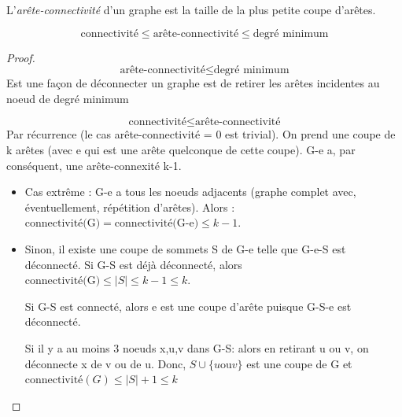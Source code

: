 \begin{mydef}
   L'\emph{arête-connectivité} d'un graphe est la taille de la plus petite coupe d'arêtes.
\end{mydef}

\begin{mytheo} 
  $$ \text{connectivité} \leq \text{arête-connectivité} \leq \text{degré minimum}$$
  \begin{proof}
    \noindent
    $$\text{arête-connectivité} \leq \text{degré minimum}$$
    Est une façon de déconnecter un graphe est de retirer les arêtes incidentes au noeud de degré minimum
    
    $$\text{connectivité} \leq \text{arête-connectivité}$$
    Par récurrence (le cas arête-connectivité = 0 est trivial). On prend une coupe de k arêtes (avec e qui est une arête quelconque de cette coupe). G-e a, par conséquent, une arête-connexité k-1. 
    \begin{itemize}
      \item Cas extrême : G-e a tous les noeuds adjacents (graphe complet avec, éventuellement, répétition d'arêtes). Alors : $\text{connectivité(G)}=\text{connectivité(G-e)} \leq k-1$.
      \item Sinon, il existe une coupe de sommets S de G-e telle que G-e-S est déconnecté.
        Si G-S est déjà déconnecté, alors $\text{connectivité(G)} \leq |S| \leq k - 1 \leq k$.

        Si G-S est connecté, alors e est une coupe d'arête puisque G-S-e est déconnecté.

        Si il y a au moins 3 noeuds x,u,v dans G-S: alors en retirant u ou v, on déconnecte x de v ou de u.
        Donc,
        $S \cup \{u \text{ou} v\}$ est une coupe de G et $\text{connectivité}(G) \leq |S| + 1  \leq k$
    \end{itemize}
 \end{proof}
\end{mytheo}

